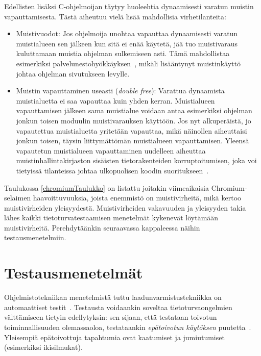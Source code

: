 Edellisten lisäksi C-ohjelmoijan täytyy huoleehtia dynaamisesti varatun muistin vapauttamisesta.
Tästä aiheutuu vielä lisää mahdollisia virhetilanteita:

\begin{itemize}
    \item Muistivuodot: Jos ohjelmoija unohtaa vapauttaa dynaamisesti varatun muistialueen
          sen jälkeen kun sitä ei enää käytetä,
          jää tuo muistivaraus kuluttamaan muistia ohjelman sulkemiseen asti.
          Tämä mahdollistaa esimerkiksi palvelunestohyökkäyksen~\cite{SplintLCLint},
          mikäli lisääntynyt muistinkäyttö johtaa ohjelman sivutukseen levylle.
      \item Muistin vapauttaminen useasti (\emph{double free}):
          Varattua dynaamista muistialuetta ei saa vapauttaa kuin yhden kerran.
          Muistialueen vapauttamisen jälkeen sama muistialue voidaan antaa esimerkiksi
          ohjelman jonkun toisen moduulin muistivarauksen käyttöön.
          Jos nyt alkuperäistä, jo vapautettua muistialuetta yritetään vapauttaa,
          mikä näinollen aiheuttaisi jonkun toisen, täysin liittymättömän muistialueen vapauttamisen.
          Yleensä vapautetun muistialueen vapauttaminen uudelleen aiheuttaa muistinhallintakirjaston
          sisäisten tietorakenteiden korruptoitumisen,
          joka voi tietyissä tilanteissa johtaa ulkopuolisen koodin suoritukseen~\cite{DoubleFree}.
\end{itemize}

Taulukossa \ref{chromiumTaulukko} on listattu joitakin viimeaikaisia Chromium-selaimen haavoittuvuuksia,
joista enemmistö on muistivirheitä,
mikä kertoo muistivirheiden yleisyydestä.
Muistivirheiden vakavuuden ja yleisyyden takia lähes kaikki tietoturvatestaamisen menetelmät
kykenevät löytämään muistivirheitä.
Perehdytäänkin seuraavassa kappaleessa näihin testausmenetelmiin.

\section{Testausmenetelmät}
\label{Testausmenetelmat}

Ohjelmistotekniikan menetelmistä tuttu laadunvarmistustekniikka on automaattiset testit~\cite[23.1]{Sommerville}.
Testausta voidaankin soveltaa tietoturvaongelmien välttämiseen tietyin edellytyksin:
sen sijaan, että testataan toivotun toiminnallisuuden olemassaoloa,
testataankin \emph{epätoivotun käytöksen} puutetta~\cite{OuluBrowser}.
Yleisempiä epätoivottuja tapahtumia ovat kaatumiset ja jumiutumiset (esimerkiksi ikisilmukat).

